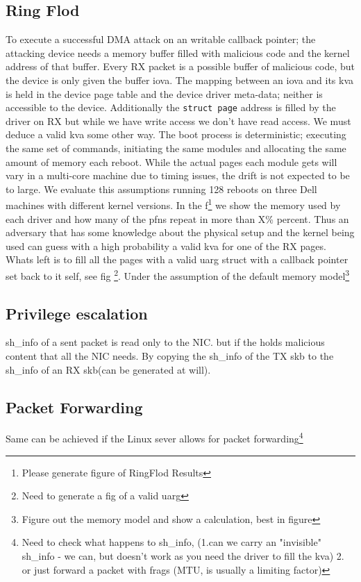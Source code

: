 \subsection{Ring Flod}
To execute a successful DMA attack on an writable callback pointer; the attacking device needs a memory buffer filled with malicious code and the kernel address of that buffer.
Every RX packet is a possible buffer of malicious code, but the device is only given the buffer iova. The mapping between an iova and its kva is held in the device page table and the device driver meta-data; neither is accessible to the device. Additionally the \texttt{struct page} address is filled by the driver on RX but while we have write access we don't have read access. We must deduce a valid kva some other way.\newline
The boot process is deterministic; executing the same set of commands, initiating the same modules and allocating the same amount of memory each reboot. While the actual pages each module gets will vary in a multi-core machine due to timing issues, the drift is not expected to be to large. We evaluate this assumptions running 128 reboots on three Dell machines with different kernel versions. In the f\footnote{Please generate figure of RingFlod Results} we show the memory used by each driver and how many of the pfns repeat in more than X\% percent. Thus an adversary that has some knowledge about the physical setup and the kernel being used can guess with a high probability a valid kva for one of the RX pages. Whats left is to fill all the pages with a valid uarg struct with a callback pointer set back to it self, see fig \footnote{Need to generate a fig of a valid uarg}. Under the assumption of the default memory model\footnote{Figure out the memory model and show a calculation, best in figure}

\subsection{Privilege escalation}
sh\_info of a sent packet is read only to the NIC.
but if the \page holds malicious content that all the NIC needs. By copying the sh\_info of the TX skb to the sh\_info of an RX skb(can be generated at will). 

\subsection{Packet Forwarding}
Same can be achieved if the Linux sever allows for packet forwarding\footnote{Need to check what happens to sh\_info, (1.can we carry an "invisible" sh\_info - we can, but doesn't work as you need the driver to fill the kva) 2. or just forward a packet with frags (MTU, is usually a limiting factor)}

